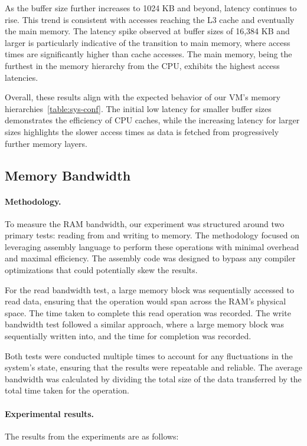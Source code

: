 As the buffer size further increases to 1024 KB and beyond, latency continues to rise. This trend is consistent with accesses reaching the L3 cache and eventually the main memory. The latency spike observed at buffer sizes of 16,384 KB and larger is particularly indicative of the transition to main memory, where access times are significantly higher than cache accesses. The main memory, being the furthest in the memory hierarchy from the CPU, exhibits the highest access latencies.

Overall, these results align with the expected behavior of our VM's memory hierarchies~\ref{table:sys-conf}. The initial low latency for smaller buffer sizes demonstrates the efficiency of CPU caches, while the increasing latency for larger sizes highlights the slower access times as data is fetched from progressively further memory layers.

\subsection{Memory Bandwidth}
\paragraph{Methodology.}
To measure the RAM bandwidth, our experiment was structured around two primary tests: reading from and writing to memory. The methodology focused on leveraging assembly language to perform these operations with minimal overhead and maximal efficiency. The assembly code was designed to bypass any compiler optimizations that could potentially skew the results.

For the read bandwidth test, a large memory block was sequentially accessed to read data, ensuring that the operation would span across the RAM's physical space. The time taken to complete this read operation was recorded. The write bandwidth test followed a similar approach, where a large memory block was sequentially written into, and the time for completion was recorded.

Both tests were conducted multiple times to account for any fluctuations in the system's state, ensuring that the results were repeatable and reliable. The average bandwidth was calculated by dividing the total size of the data transferred by the total time taken for the operation.

\paragraph{Experimental results.}
The results from the experiments are as follows:

